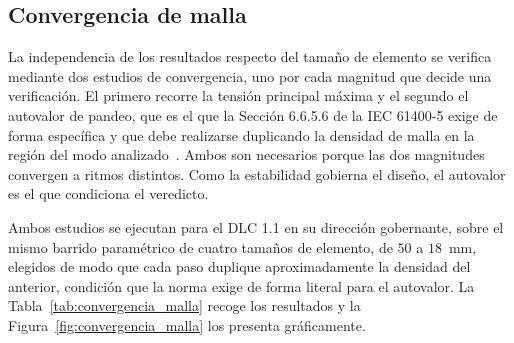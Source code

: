 \subsection{Convergencia de malla}

La independencia de los resultados respecto del tamaño de elemento se verifica mediante dos estudios de convergencia, uno por cada magnitud que decide una verificación. El primero recorre la tensión principal máxima y el segundo el autovalor de pandeo, que es el que la Sección 6.6.5.6 de la IEC 61400-5 exige de forma específica y que debe realizarse duplicando la densidad de malla en la región del modo analizado~\parencite*{IEC61400-5}. Ambos son necesarios porque las dos magnitudes convergen a ritmos distintos. Como la estabilidad gobierna el diseño, el autovalor es el que condiciona el veredicto.

Ambos estudios se ejecutan para el DLC 1.1 en su dirección gobernante, sobre el mismo barrido paramétrico de cuatro tamaños de elemento, de $50$ a $18$~mm, elegidos de modo que cada paso duplique aproximadamente la densidad del anterior, condición que la norma exige de forma literal para el autovalor. La Tabla~\ref{tab:convergencia_malla} recoge los resultados y la Figura~\ref{fig:convergencia_malla} los presenta gráficamente.

